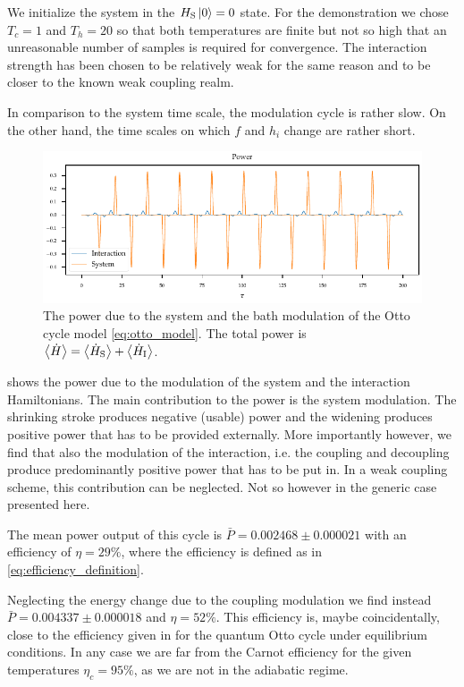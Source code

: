 We initialize the system in the \(H_{\mathrm{S}}\ket{0}=0\) state.  For the
demonstration we chose \(T_{c}=1\) and \(T_{h}=20\) so that both
temperatures are finite but not so high that an unreasonable number of
samples is required for convergence. The interaction strength has been
chosen to be relatively weak for the same reason and to be closer to
the known weak coupling realm.

In comparison to the system time scale, the modulation cycle is rather
slow. On the other hand, the time scales on which \(f\) and \(h_{i}\)
change are rather short.

\begin{figure}[hp]
  \centering
  \includegraphics{figs/otto/power}
  \caption{\label{fig:ottopower} The power due to the system and the
    bath modulation of the Otto cycle model \cref{eq:otto_model}. The
    total power is
    \(\ev{\dot{H}} = \ev{\dot{H}_{\sys}} + \ev{\dot{H}_{\inter}}\). }
\end{figure}
 shows the power due to the modulation of the
system and the interaction Hamiltonians. The main contribution to the
power is the system modulation. The shrinking stroke produces negative
(usable) power and the widening produces positive power that has to be
provided externally. More importantly however, we find that also the
modulation of the interaction, i.e. the coupling and decoupling
produce predominantly positive power that has to be put in. In a weak
coupling scheme, this contribution can be neglected. Not so however in
the generic case presented here.

The mean power output of this cycle is
\(\bar{P}=0.002468\pm 0.000021\) with an efficiency of \(η=29\%\),
where the efficiency is defined as in \cref{eq:efficiency_definition}.

Neglecting the energy change due to the coupling
modulation we find instead \(\bar{P}=0.004337\pm 0.000018\) and
\(η=52\%\).  This efficiency is, maybe coincidentally, close to the
efficiency given in \cite{Geva1992Feb} for the quantum Otto cycle
under equilibrium conditions. In any case we are far from the Carnot
efficiency for the given temperatures \(η_{c}=95\%\), as we are not in
the adiabatic regime.

